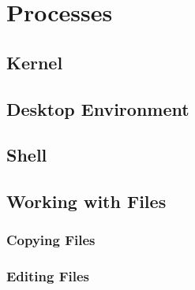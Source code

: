 \section{Processes}

\subsection{Kernel}

\subsection{Desktop Environment}

\subsection{Shell}

\subsection{Working with Files}

\subsubsection{Copying Files}

\subsubsection{Editing Files}
